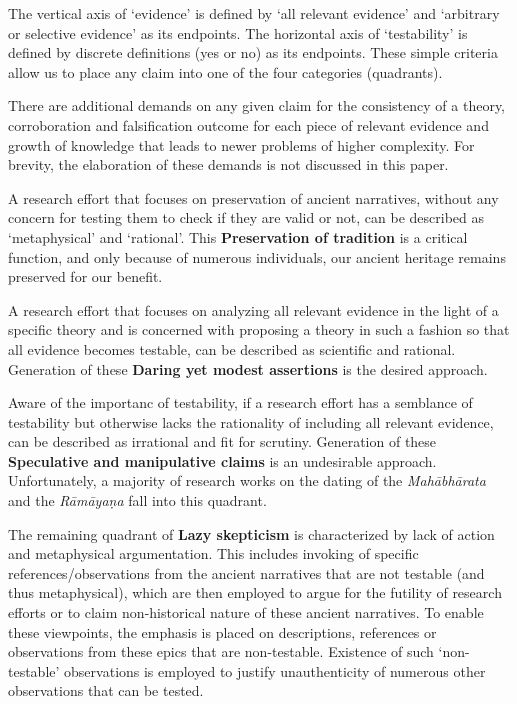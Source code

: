 The vertical axis of ‘evidence’ is defined by ‘all relevant evidence’ and ‘arbitrary or selective evidence’ as its endpoints. The horizontal axis of ‘testability’ is defined by discrete definitions (yes or no) as its endpoints. These simple criteria allow us to place any claim into one of the four categories (quadrants).

There are additional demands on any given claim for the consistency of a theory, corroboration and falsification outcome for each piece of relevant evidence and growth of knowledge that leads to newer problems of higher complexity. For brevity, the elaboration of these demands is not discussed in this paper.


A research effort that focuses on preservation of ancient narratives, without any concern for testing them to check if they are valid or not, can be described as ‘metaphysical’ and ‘rational’. This \textbf{Preservation of tradition} is a critical function, and only because of numerous individuals, our ancient heritage remains preserved for our benefit.

A research effort that focuses on analyzing all relevant evidence in the light of a specific theory and is concerned with proposing a theory in such a fashion so that all evidence becomes testable, can be described as scientific and rational. Generation of these \textbf{Daring yet modest assertions} is the desired approach.

Aware of the importanc of testability, if a research effort has a semblance of testability but otherwise lacks the rationality of including all relevant evidence, can be described as irrational and fit for scrutiny. Generation of these \textbf{Speculative and manipulative claims} is an undesirable approach. Unfortunately, a majority of research works on the dating of the \textit{Mahābhārata} and the \textit{Rāmāyaṇa} fall into this quadrant.

The remaining quadrant of \textbf{Lazy skepticism} is characterized by lack of action and metaphysical argumentation. This includes invoking of specific references/observations from the ancient narratives that are not testable (and thus metaphysical), which are then employed to argue for the futility of research efforts or to claim non-historical nature of these ancient narratives. To enable these viewpoints, the emphasis is placed on descriptions, references or observations from these epics that are non-testable. Existence of such ‘non-testable’ observations is employed to justify unauthenticity of numerous other observations that can be tested.

